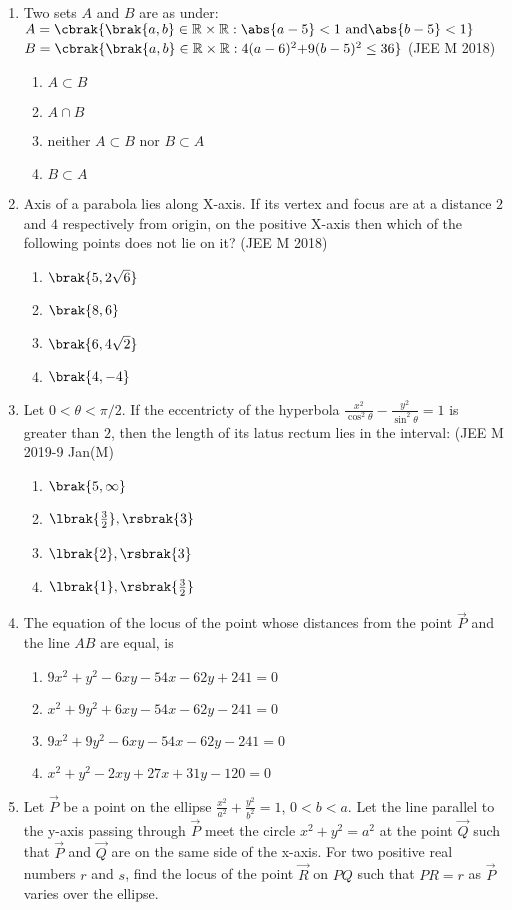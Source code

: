 \begin{enumerate}
\item  Two sets $A$ and $B$ are as under:
$A=\cbrak{\brak{a,b}\in\mathbb{R}\times\mathbb{R}:\abs{a-5}<1\text{ and} \abs{b-5}<1}$
$B=\cbrak{\brak{a,b}\in\mathbb{R}\times\mathbb{R}:4(a-6)^2\text{+}9(b-5)^2\leq36}$
    \hfill{(JEE M 2018)}
	\begin{enumerate}
		\item $A\subset B$ 
		\item $A\cap B$
		\item neither $A\subset B$ nor $B\subset A$
		\item $B\subset A$
	\end{enumerate}
\item Axis of a parabola lies along X-axis. If its vertex and focus are at a distance $2$ and $4$ respectively from origin, on the positive X-axis then which of the following points does not lie on it? 
     \hfill{(JEE M 2018)} 
	\begin{enumerate}
    		\item $\brak{5,2\sqrt6}$
    		\item $\brak{8,6}$
    		\item $\brak{6,4\sqrt2}$
    		\item $\brak{4,-4}$
	\end{enumerate}
\item Let $0<\theta<\pi/2$. If the eccentricty of the hyperbola $\frac{x^2}{\cos^2{\theta}} - \frac{y^2}{\sin^2{\theta}} = 1$ is greater than $2$, then the length of its latus rectum lies in the interval:
          \hfill{(JEE M 2019-9 Jan(M)}
	\begin{enumerate}
    		\item $\brak{5,\infty}$
    		\item $\lbrak{\frac{3}{2}},\rsbrak{3}$
    		\item $\lbrak{2},\rsbrak{3}$ 
    		\item $\lbrak{1},\rsbrak{\frac{3}{2}}$
	\end{enumerate} 
\item  The equation of the locus of the point whose distances from the point $\Vec{P}$ and the line $AB$ are equal, is

\begin{enumerate}
     \item $9x^2+y^2-6xy-54x-62y+241=0$
     \item $x^2+9y^2+6xy-54x-62y-241=0$
     \item $9x^2+9y^2-6xy-54x-62y-241=0$
     \item $x^2+y^2-2xy+27x+31y-120=0$
\end{enumerate}
\item Let $\vec{P}$ be a point on the ellipse $\frac{x^2}{a^2}+\frac{y^2}{b^2}=1$, $0<b<a$. Let the line parallel to the y-axis passing through $\vec{P}$ meet the circle $x^2+y^2=a^2$ at the point $\vec{Q}$ such that $\vec{P}$ and $\vec{Q}$ are on the same side of the x-axis. For two positive real numbers $r$ and $s$, find the locus of the point $\vec{R}$ on $PQ$ such that $PR
= r$ as $\vec{P}$ varies over the ellipse. \hfill{}


\end{enumerate}
